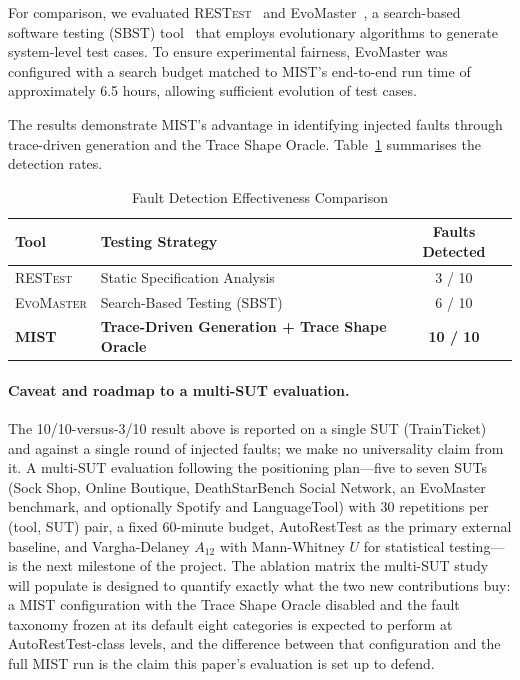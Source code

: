 \documentclass[conference]{IEEEtran}
\begin{document}
For comparison, we evaluated \textsc{RESTest}~\cite{martin2019restest}
and EvoMaster~\cite{Arcuri2020}, a search-based software testing
(SBST) tool~\cite{harman2001search} that employs evolutionary
algorithms to generate system-level test cases. To ensure experimental
fairness, EvoMaster was configured with a search budget matched to
\textsc{MIST}'s end-to-end run time of approximately 6.5 hours, allowing
sufficient evolution of test cases.

The results demonstrate \textsc{MIST}'s advantage in identifying injected faults through trace-driven generation and the Trace Shape Oracle. Table~\ref{tab:fault_comparison} summarises the detection rates.



\begin{table}[h]
\centering
\caption{Fault Detection Effectiveness Comparison}
\label{tab:fault_comparison}
\begin{tabularx}{\columnwidth}{l X c}
\toprule
\textbf{Tool} & \textbf{Testing Strategy} & \textbf{Faults Detected} \\
\midrule
\textsc{RESTest} & Static Specification Analysis & 3 / 10 \\
\textsc{EvoMaster} & Search-Based Testing (SBST) & 6 / 10 \\
\textbf{\textsc{MIST}} & \textbf{Trace-Driven Generation + Trace Shape Oracle} & \textbf{10 / 10} \\
\bottomrule
\end{tabularx}
\end{table}

\paragraph{Caveat and roadmap to a multi-SUT evaluation.}
The 10/10-versus-3/10 result above is reported on a single SUT
(TrainTicket) and against a single round of injected faults; we make no
universality claim from it.  A multi-SUT evaluation following the
positioning plan---five to seven SUTs (Sock Shop, Online Boutique,
DeathStarBench Social Network, an EvoMaster benchmark, and optionally
Spotify and LanguageTool) with 30 repetitions per (tool, SUT) pair, a
fixed 60-minute budget, AutoRestTest as the primary external baseline,
and Vargha-Delaney $A_{12}$ with Mann-Whitney $U$ for statistical
testing---is the next milestone of the project.  The ablation matrix
the multi-SUT study will populate is designed to quantify exactly what
the two new contributions buy: a \textsc{MIST} configuration with the
Trace Shape Oracle disabled and the fault taxonomy frozen at its
default eight categories is expected to perform at AutoRestTest-class
levels, and the difference between that configuration and the full
\textsc{MIST} run is the claim this paper's evaluation is set up to
defend.



\end{document}
